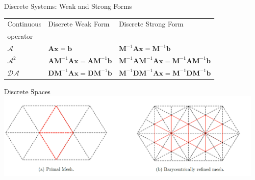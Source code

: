 \documentclass[12pt]{beamer}
\begin{document}
\begin{frame}{Discrete Systems: Weak and Strong Forms}
\hspace*{-2cm}
\begin{footnotesize}
\begin{table}
\centering
\begin{tabular}{lll}
\toprule
Continuous  & Discrete Weak Form  & Discrete Strong Form        \\
operator & & \\
\midrule
$\bm{\mathcal{A}}$ & $\mathbf{A}\mathbf{x} = \mathbf{b}$& $\mathbf{M}^{-1}\mathbf{A}\mathbf{x} = \mathbf{M}^{-1}\mathbf{b}$ \\[5pt]
%
$\bm{\mathcal{A}}^2$ & $\mathbf{A}\mathbf{M}^{-1}\mathbf{A}\mathbf{x} = \mathbf{A}\mathbf{M}^{-1}\mathbf{b}
$ & $\mathbf{M}^{-1}\mathbf{A}\mathbf{M}^{-1}\mathbf{A}\mathbf{x} = \mathbf{M}^{-1}\mathbf{A}\mathbf{M}^{-1}\mathbf{b}
$\\[5pt]
%
$\bm{\mathcal{D}}\bm{\mathcal{A}}$ & $\mathbf{D}\mathbf{M}^{-1}\mathbf{A}\mathbf{x} = \mathbf{D}\mathbf{M}^{-1}\mathbf{b}
$ & $\mathbf{M}^{-1}\mathbf{D}\mathbf{M}^{-1}\mathbf{A}\mathbf{x} = \mathbf{M}^{-1}\mathbf{D}\mathbf{M}^{-1}\mathbf{b}
$\\[5pt]
\bottomrule
\end{tabular}
\end{table}
\end{footnotesize}
\end{frame}

\begin{frame}{Discrete Spaces}
\includegraphics[width = 0.9 \textwidth]{Figures/basis_functions.png} 
\end{frame}
\end{document}
